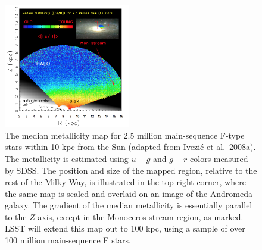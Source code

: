 \begin{figure}
\includegraphics[width=0.49\textwidth,clip]{panelsLSST.png}
\caption{
The median metallicity map for 2.5 million main-sequence F-type stars within 10 kpc
from the Sun (adapted from Ivezi\'{c} et al.~2008a). The metallicity is estimated using
$u-g$ and $g-r$ colors measured by SDSS. The position and size of the mapped
region, relative to the rest of the Milky Way, is illustrated in the top right
corner, where the same map is scaled and overlaid on an image of the Andromeda
galaxy. The gradient of the median metallicity is essentially parallel
to the $Z$ axis, except in the Monoceros stream region, as marked. LSST
will extend this map out to 100 kpc, using a sample of over 100 million
main-sequence F stars.}
\label{Fig:FeH3}
\end{figure}



